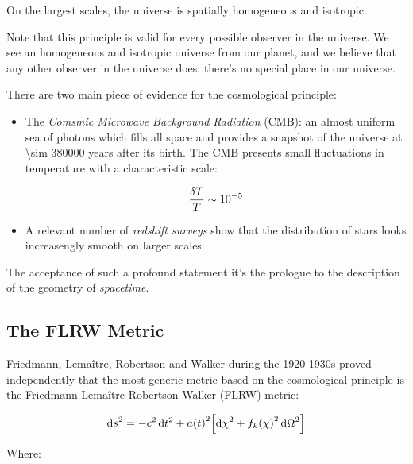 \begin{principle}
        On the largest scales, the universe is spatially homogeneous and isotropic.
\end{principle}

Note that this principle is valid for every possible observer in the
universe. We see an homogeneous and isotropic universe from our planet, and
we believe that any other observer in the universe does: there's no special
place in our universe.

There are two main piece of evidence for the cosmological principle:

\begin{itemize}
        \item The \emph{Comsmic Microwave Background Radiation} (CMB): an almost
        uniform sea of photons which fills all space and provides a snapshot of the
        universe at \num{\sim 380000} years after its birth. The CMB
        presents small fluctuations in temperature with a characteristic
        scale:

        \begin{equation}
                \frac{\var{T}}{T} \sim \num{e-5}
        \end{equation}

        \item A relevant number of \emph{redshift surveys} show that the
        distribution of stars looks increasengly smooth on larger scales.
\end{itemize}

The acceptance of such a profound statement it's the prologue to the
description of the geometry of \emph{spacetime}.

\subsection{The FLRW Metric}\label{ss:flrw}

Friedmann, Lema\^itre, Robertson and Walker during the 1920-1930s proved
independently that the most generic metric based on the cosmological
principle is the Friedmann-Lema\^itre-Robertson-Walker (FLRW) metric:

\begin{equation}
        \dd{s}^2 = -c^2\dd{t^2} + a\qty(t)^2\qty[\dd{\chi}^2 +
        f_k\qty(\chi)^2\dd{\Omega}^2]
        \label{eq:flrw}
\end{equation}

Where:

